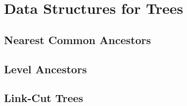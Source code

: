 \chapter{Data Structures for Trees}

\section{Nearest Common Ancestors}

\section{Level Ancestors}

\section{Link-Cut Trees}



